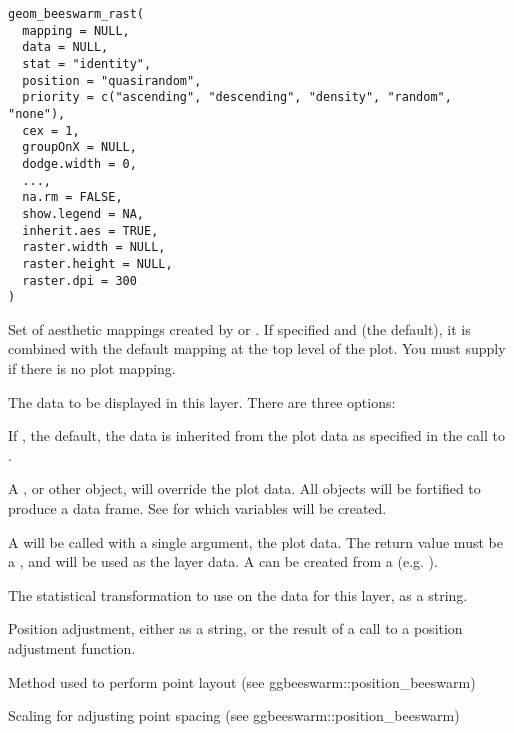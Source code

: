 \documentclass[a4paper]{book}
\begin{document}
%
\begin{Usage}
\begin{verbatim}
geom_beeswarm_rast(
  mapping = NULL,
  data = NULL,
  stat = "identity",
  position = "quasirandom",
  priority = c("ascending", "descending", "density", "random", "none"),
  cex = 1,
  groupOnX = NULL,
  dodge.width = 0,
  ...,
  na.rm = FALSE,
  show.legend = NA,
  inherit.aes = TRUE,
  raster.width = NULL,
  raster.height = NULL,
  raster.dpi = 300
)
\end{verbatim}
\end{Usage}
%
\begin{Arguments}
\begin{ldescription}
\item[\code{mapping}] Set of aesthetic mappings created by  or
. If specified and  (the
default), it is combined with the default mapping at the top level of the
plot. You must supply  if there is no plot mapping.

\item[\code{data}] The data to be displayed in this layer. There are three
options:

If , the default, the data is inherited from the plot
data as specified in the call to .

A , or other object, will override the plot
data. All objects will be fortified to produce a data frame. See
 for which variables will be created.

A  will be called with a single argument,
the plot data. The return value must be a , and
will be used as the layer data. A  can be created
from a  (e.g. ).

\item[\code{stat}] The statistical transformation to use on the data for this
layer, as a string.

\item[\code{position}] Position adjustment, either as a string, or the result of
a call to a position adjustment function.

\item[\code{priority}] Method used to perform point layout (see ggbeeswarm::position\_beeswarm)

\item[\code{cex}] Scaling for adjusting point spacing (see ggbeeswarm::position\_beeswarm)


\end{ldescription}
\end{Arguments}
\end{document}
